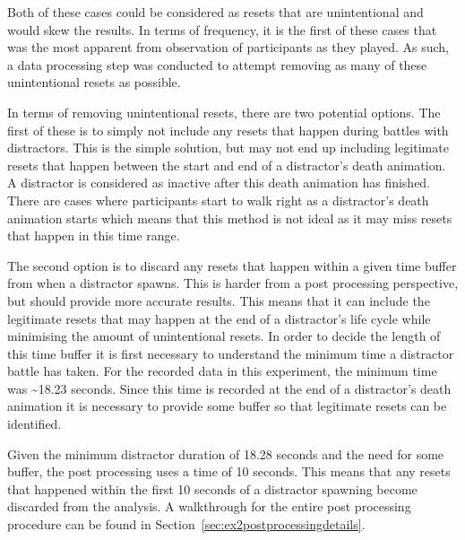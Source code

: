 Both of these cases could be considered as resets that are unintentional and would skew the results. In terms of frequency, it is the first of these cases that was the most apparent from observation of participants as they played. As such, a data processing step was conducted to attempt removing as many of these unintentional resets as possible. 

In terms of removing unintentional resets, there are two potential options. The first of these is to simply not include any resets that happen during battles with distractors. This is the simple solution, but may not end up including legitimate resets that happen between the start and end of a distractor's death animation. A distractor is considered as inactive after this death animation has finished. There are cases where participants start to walk right as a distractor's death animation starts which means that this method is not ideal as it may miss resets that happen in this time range. 

The second option is to discard any resets that happen within a given time buffer from when a distractor spawns. This is harder from a post processing perspective, but should provide more accurate results. This means that it can include the legitimate resets that may happen at the end of a distractor's life cycle while minimising the amount of unintentional resets. 
In order to decide the length of this time buffer it is first necessary to understand the minimum time a distractor battle has taken. For the recorded data in this experiment, the minimum time was \textasciitilde18.23 seconds. Since this time is recorded at the end of a distractor's death animation it is necessary to provide some buffer so that legitimate resets can be identified.

Given the minimum distractor duration of 18.28 seconds and the need for some buffer, the post processing uses a time of 10 seconds. This means that any resets that happened within the first 10 seconds of a distractor spawning become discarded from the analysis. A walkthrough for the entire post processing procedure can be found in Section~\ref{sec:ex2postprocessingdetails}.

